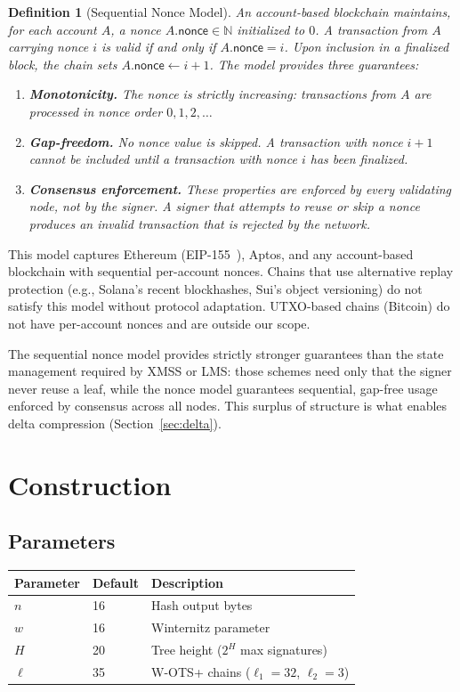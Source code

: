 \documentclass[11pt]{article}
\newtheorem{definition}[theorem]{Definition}
\begin{document}
\begin{definition}[Sequential Nonce Model]\label{def:nonce}
An account-based blockchain maintains, for each account $A$, a nonce
$A.\mathsf{nonce} \in \mathbb{N}$ initialized to $0$. A transaction
from $A$ carrying nonce $i$ is valid if and only if
$A.\mathsf{nonce} = i$. Upon inclusion in a finalized block, the chain
sets $A.\mathsf{nonce} \leftarrow i + 1$. The model provides three
guarantees:
\begin{enumerate}
\item \textbf{Monotonicity.} The nonce is strictly increasing:
transactions from $A$ are processed in nonce order $0, 1, 2, \ldots$
\item \textbf{Gap-freedom.} No nonce value is skipped. A transaction
with nonce $i + 1$ cannot be included until a transaction with nonce
$i$ has been finalized.
\item \textbf{Consensus enforcement.} These properties are enforced by
every validating node, not by the signer. A signer that attempts to
reuse or skip a nonce produces an invalid transaction that is rejected
by the network.
\end{enumerate}
\end{definition}

This model captures Ethereum (EIP-155~\cite{eip155}), Aptos, and any
account-based blockchain with sequential per-account nonces. Chains
that use alternative replay protection (e.g., Solana's recent
blockhashes, Sui's object versioning) do not satisfy this model without
protocol adaptation. UTXO-based chains (Bitcoin) do not have
per-account nonces and are outside our scope.

The sequential nonce model provides strictly stronger guarantees than
the state management required by XMSS or LMS: those schemes need
only that the signer never reuse a leaf, while the nonce model
guarantees sequential, gap-free usage enforced by consensus across all
nodes. This surplus of structure is what enables delta compression
(Section~\ref{sec:delta}).

\section{Construction}\label{sec:construction}

\subsection{Parameters}

\begin{center}
\begin{tabular}{lll}
\toprule
Parameter & Default & Description \\
\midrule
$n$ & 16 & Hash output bytes \\
$w$ & 16 & Winternitz parameter \\
$H$ & 20 & Tree height ($2^H$ max signatures) \\
$\ell$ & 35 & W-OTS+ chains ($\ell_1 = 32$, $\ell_2 = 3$) \\
\bottomrule
\end{tabular}
\end{center}
\end{document}
